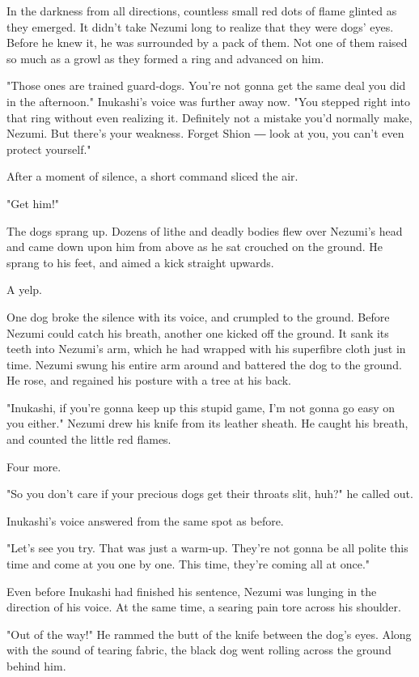 In the darkness from all directions, countless small red dots of flame
glinted as they emerged. It didn't take Nezumi long to realize that they
were dogs' eyes. Before he knew it, he was surrounded by a pack of them.
Not one of them raised so much as a growl as they formed a ring and
advanced on him.

"Those ones are trained guard-dogs. You're not gonna get the same deal
you did in the afternoon." Inukashi's voice was further away now. "You
stepped right into that ring without even realizing it. Definitely not a
mistake you'd normally make, Nezumi. But there's your weakness. Forget
Shion ― look at you, you can't even protect yourself."

After a moment of silence, a short command sliced the air.

"Get him!"

The dogs sprang up. Dozens of lithe and deadly bodies flew over Nezumi's
head and came down upon him from above as he sat crouched on the ground.
He sprang to his feet, and aimed a kick straight upwards.

A yelp.

One dog broke the silence with its voice, and crumpled to the ground.
Before Nezumi could catch his breath, another one kicked off the ground.
It sank its teeth into Nezumi's arm, which he had wrapped with his
superfibre cloth just in time. Nezumi swung his entire arm around and
battered the dog to the ground. He rose, and regained his posture with a
tree at his back.

"Inukashi, if you're gonna keep up this stupid game, I'm not gonna go
easy on you either." Nezumi drew his knife from its leather sheath. He
caught his breath, and counted the little red flames.

Four more.

"So you don't care if your precious dogs get their throats slit, huh?"
he called out.

Inukashi's voice answered from the same spot as before.

"Let's see you try. That was just a warm-up. They're not gonna be all
polite this time and come at you one by one. This time, they're coming
all at once."

Even before Inukashi had finished his sentence, Nezumi was lunging in
the direction of his voice. At the same time, a searing pain tore across
his shoulder.

"Out of the way!" He rammed the butt of the knife between the dog's
eyes. Along with the sound of tearing fabric, the black dog went rolling
across the ground behind him.

